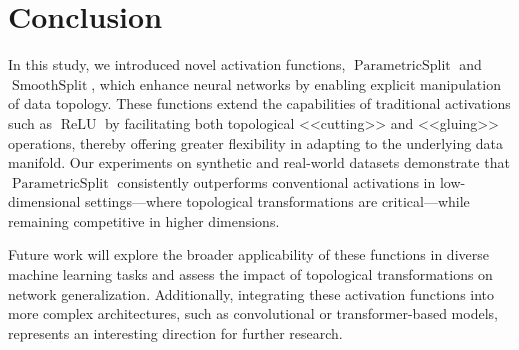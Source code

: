 \documentclass{esannV2}
\DeclareMathOperator{\relu}{\mathrm{ReLU}}
\DeclareMathOperator{\smoothsplit}{\mathrm{SmoothSplit}}
\DeclareMathOperator{\parametricsplit}{\mathrm{ParametricSplit}}
\begin{document}
\section{Conclusion}
In this study, we introduced novel activation functions, \(\parametricsplit\) and \(\smoothsplit\), which enhance neural networks by enabling explicit manipulation of data topology. These functions extend the capabilities of traditional activations such as \(\relu\) by facilitating both topological <<cutting>> and <<gluing>> operations, thereby offering greater flexibility in adapting to the underlying data manifold. Our experiments on synthetic and real-world datasets demonstrate that \(\parametricsplit\) consistently outperforms conventional activations in low-dimensional settings—where topological transformations are critical—while remaining competitive in higher dimensions.

Future work will explore the broader applicability of these functions in diverse machine learning tasks and assess the impact of topological transformations on network generalization. Additionally, integrating these activation functions into more complex architectures, such as convolutional or transformer-based models, represents an interesting direction for further research.

\begin{footnotesize}
  
  
\end{footnotesize}
\end{document}
